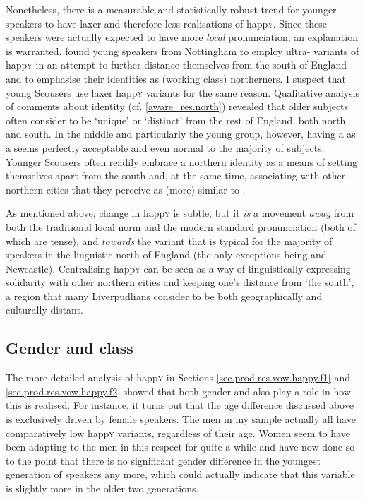 Nonetheless, there is a measurable and statistically robust trend for younger speakers to have laxer and therefore less  realisations of happ\textsc{y}.
Since these speakers were actually expected to have more \emph{local} pronunciation, an explanation is warranted.
\textcite{flynn2010} found young speakers from Nottingham to employ ultra- variants of happ\textsc{y} in an attempt to further distance themselves from the south of England and to emphasise their identities as (working class) northerners.
I suspect that young Scousers use laxer happ\textsc{y} variants for the same reason.
Qualitative analysis of comments about identity (cf. \ref{aware_res.north}) revealed that older subjects often consider  to be `unique' or `distinct' from the rest of England, both north and south.
In the middle and particularly the young group, however, having a  as a  seems perfectly acceptable and even normal to the majority of subjects.
Younger Scousers often readily embrace a northern identity as a means of setting themselves apart from the south and, at the same time, associating with other northern cities that they perceive as (more) similar to .

As mentioned above, change in happ\textsc{y} is subtle, but it \emph{is} a movement \emph{away} from both the traditional local norm and the modern standard pronunciation (both of which are tense), and \emph{towards} the variant that is typical for the majority of speakers in the linguistic north of England (the only exceptions being  and Newcastle).
Centralising happ\textsc{y} can be seen as a way of linguistically expressing solidarity with other northern cities and keeping one's distance from `the south', a region that many Liverpudlians consider to be both geographically and culturally distant.

\subsection{Gender and class}
\label{prod.disc.happy.social}

The more detailed analysis of happ\textsc{y} in Sections \ref{sec.prod.res.vow.happy.f1} and \ref{sec.prod.res.vow.happy.f2} showed that both gender and  also play a role in how this  is realised.
For instance, it turns out that the age difference discussed above is exclusively driven by female speakers.
The men in my sample actually all have comparatively low happ\textsc{y} variants, regardless of their age.
Women seem to have been adapting to the men in this respect for quite a while and have now done so to the point that there is no significant gender difference in the youngest generation of speakers any more, which could actually indicate that this variable is slightly more  in the older two generations.

